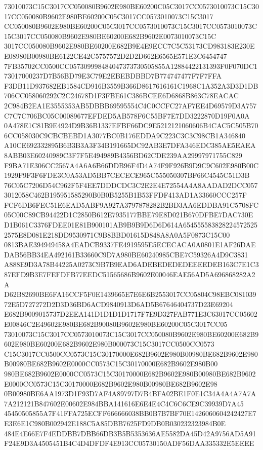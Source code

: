 \documentclass[UTF8,fontset=fandol,zihao=-4,a4paper]{ctexart}
\begin{document}
{{73010073C15C3017CC050080B9602E980BE60200C05C3017CC0573010073C15C3017CC050080B9602E980BE60200C05C3017CC0573010073C15C3017
CC050080B9602E980BE60200C05C3017CC0573010073C15C3017CC0573010073C15C3017CC050080B9602E980BE60200E682B9602E0073010073C15C
3017CC050080B9602E980BE60200E682B9E4E9ECC7C5C53173CD983183E230EE08980B00980BE6122CE42C5757572D2D2D662E6565E571E3C6454747
7FB35702CC0500CC057309998484047373730505855A12884422131393F0F070DC173017000237D7B56BD79E3C79E2EBEBDBBD7B774747477F7F7FFA
F3DB11D937682EB1584CD916B3559B366D8617616161C1968C1A352A3D3D1DB706CC058060292C2C24678D1F3FBE61C386BCEE6D6868B863C78EACAC
2C984B2EA1E3555353AB5DBBB69595554C4C0CCFC27AF7EE4D69579D3A757C7C7C706BC05C00089677EFDED5AB578F6C55BF7E7DD3222870D19F0A0A
0A478E1C81B9E4924D9B36B1337EFBF66DC9E5212121060606B4CAC5C505B706CC058030C9CBCBEBD1A3077BC0B176EDDA9C223C3C3C98CB1A346840
A10CE692332895B6B3B3A3F34B191665DC92AB3E7DFA346EDC385AE5EAEA8ABB03E60240989C3F7F5E494989B4356BD62CDE239AA29997971755C829
F9BA71E306CC2567A4A6A6B66DDB96F4D4A74F9F926B9D9C9C602E980B00C1929F9F3F6FDE3C0A53AD5BB7CECECE965C555050307BF66C4545C51D3B
76C05C7206D54C962F5F4EE7DDDCDC3C2E2E4E72554A4A8AADAD2DCC0573012058C462B195951585290B0B0B5255B1B53FFDF413AD1A33660CCC257F
FCF6DB6FEC51E6EAD5ABF9A927A3797878282B2BD3AA6EDDBA91C5708FC05C00C89CB94422D1C2850B612E7935177BBE79E8D021B670DFBE7DAC730E
D1B061C3376FDEE01E81B900101AB9B9B9D6D6D614A6545555838282245725252575E8D081E218DD9530971C9B8BBD01615D848A8A0A5F0873C15C00
0813BAE394949458A4EADCB9337FE4919595E5ECECACA0A0801E1AF26DAEDAB56BB34EA492161B33660C9D7A980BE60240985CBE7C59326A4D9C3831
A888E9D3A78B44225A0273C9B7B9EAD6ADEBEDEDEDEEEEDEB163C7E1C387EFD9B3E7FEFDFB77EEDC51565686B9602E00046EAE56AD5A696868282A2A
D62B82690BE6FA16CCF5F0E1439665E7E6E6B2553017CC05804C98EBC08103972E5D727272D2D3D36BD6ACD9840913D6AD5B67646404737D23E69204
E682B9009015737D2EEA141D1D1D1D1717F7E9D327FAB771E3C63017CC05602E00846C2E49602E980BE682B90080B9602E980BE60200C05C3017CC05
73010073C15C3017CC0573010073C15C3017CC050080B9602E980BE60200E682B9602E980BE60200E682B9602E980B000073C15C3017CC0500CC0573
C15C3017CC0500CC0573C15C30170000E682B9602E980B00980BE682B9602E980B00980BE682B9602E0000CC0573C15C30170000E682B9602E980B00
980BE682B9602E0000CC0573C15C30170000E682B9602E980B00980BE682B9602E0000CC0573C15C30170000E682B9602E980B00980BE682B9602E98
0B00980BE6AA1973D1F93D7AF4A89797D7B4BFA02BE1F0E1C34A4A4A7A7A7A212121B847602E00602E984BBA141616E6E4E4C4C6C6CE9C39939D7A45
45450505855A7F41FFA725ECFF666666038BB0B7B7BF70E1426060604242427E7E3E6E1C980B002942E188C5A85DBB7625FD9DB0B030232323984B0E
484E4E66E7F4EDDBB7DBB66DB3B5B5353636AE5582DA45D42A9756AD5A91F24E9D3A4505451B4C4D4DFDF4E913CC05730150ADF56DAA335332E5EEEE
}}
\end{document}
